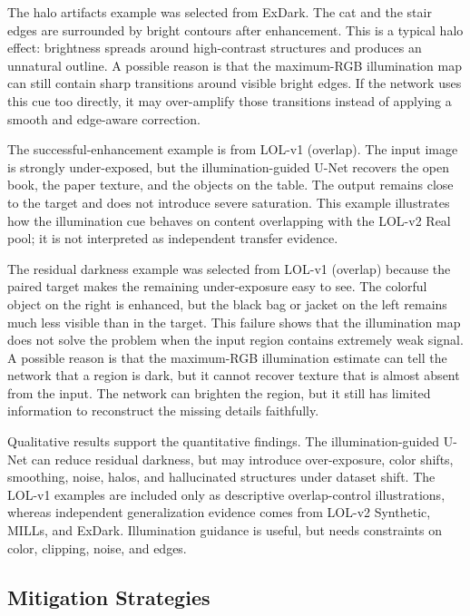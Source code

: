 The halo artifacts example was selected from ExDark. The cat and the stair edges are surrounded by bright contours after enhancement. This is a typical halo effect: brightness spreads around high-contrast structures and produces an unnatural outline. A possible reason is that the maximum-RGB illumination map can still contain sharp transitions around visible bright edges. If the network uses this cue too directly, it may over-amplify those transitions instead of applying a smooth and edge-aware correction.

The successful-enhancement example is from LOL-v1 (overlap). The input image is strongly under-exposed, but the illumination-guided U-Net recovers the open book, the paper texture, and the objects on the table. The output remains close to the target and does not introduce severe saturation. This example illustrates how the illumination cue behaves on content overlapping with the LOL-v2 Real pool; it is not interpreted as independent transfer evidence.

The residual darkness example was selected from LOL-v1 (overlap) because the paired target makes the remaining under-exposure easy to see. The colorful object on the right is enhanced, but the black bag or jacket on the left remains much less visible than in the target. This failure shows that the illumination map does not solve the problem when the input region contains extremely weak signal. A possible reason is that the maximum-RGB illumination estimate can tell the network that a region is dark, but it cannot recover texture that is almost absent from the input. The network can brighten the region, but it still has limited information to reconstruct the missing details faithfully.

Qualitative results support the quantitative findings. The illumination-guided U-Net can reduce residual darkness, but may introduce over-exposure, color shifts, smoothing, noise, halos, and hallucinated structures under dataset shift. The LOL-v1 examples are included only as descriptive overlap-control illustrations, whereas independent generalization evidence comes from LOL-v2 Synthetic, MILLs, and ExDark. Illumination guidance is useful, but needs constraints on color, clipping, noise, and edges.

\subsection{Mitigation Strategies}

